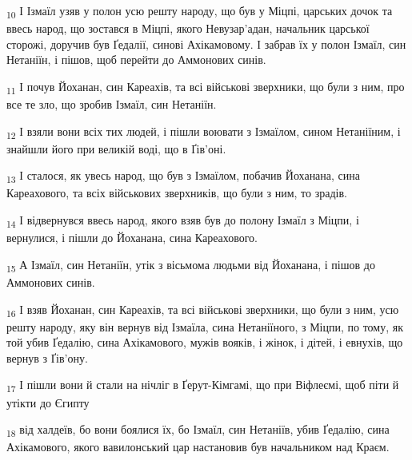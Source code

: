 \begin{tcolorbox}
\textsubscript{10} І Ізмаїл узяв у полон усю решту народу, що був у Міцпі, царських дочок та ввесь народ, що зостався в Міцпі, якого Невузар'адан, начальник царської сторожі, доручив був Ґедалії, синові Ахікамовому. І забрав їх у полон Ізмаїл, син Нетаніїн, і пішов, щоб перейти до Аммонових синів.
\end{tcolorbox}
\begin{tcolorbox}
\textsubscript{11} І почув Йоханан, син Кареахів, та всі військові зверхники, що були з ним, про все те зло, що зробив Ізмаїл, син Нетаніїн.
\end{tcolorbox}
\begin{tcolorbox}
\textsubscript{12} І взяли вони всіх тих людей, і пішли воювати з Ізмаїлом, сином Нетаніїним, і знайшли його при великій воді, що в Ґів'оні.
\end{tcolorbox}
\begin{tcolorbox}
\textsubscript{13} І сталося, як увесь народ, що був з Ізмаїлом, побачив Йоханана, сина Кареахового, та всіх військових зверхників, що були з ним, то зрадів.
\end{tcolorbox}
\begin{tcolorbox}
\textsubscript{14} І відвернувся ввесь народ, якого взяв був до полону Ізмаїл з Міцпи, і вернулися, і пішли до Йоханана, сина Кареахового.
\end{tcolorbox}
\begin{tcolorbox}
\textsubscript{15} А Ізмаїл, син Нетаніїн, утік з вісьмома людьми від Йоханана, і пішов до Аммонових синів.
\end{tcolorbox}
\begin{tcolorbox}
\textsubscript{16} І взяв Йоханан, син Кареахів, та всі військові зверхники, що були з ним, усю решту народу, яку він вернув від Ізмаїла, сина Нетаніїного, з Міцпи, по тому, як той убив Ґедалію, сина Ахікамового, мужів вояків, і жінок, і дітей, і евнухів, що вернув з Ґів'ону.
\end{tcolorbox}
\begin{tcolorbox}
\textsubscript{17} І пішли вони й стали на нічліг в Ґерут-Кімгамі, що при Віфлеємі, щоб піти й утікти до Єгипту
\end{tcolorbox}
\begin{tcolorbox}
\textsubscript{18} від халдеїв, бо вони боялися їх, бо Ізмаїл, син Нетаніїв, убив Ґедалію, сина Ахікамового, якого вавилонський цар настановив був начальником над Краєм.
\end{tcolorbox}
